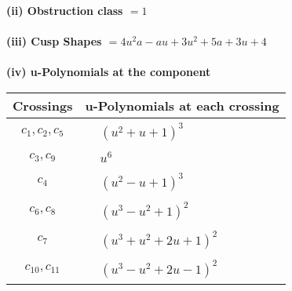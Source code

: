 \documentclass[1p]{elsarticle_modified}
\theoremstyle{definition}
\begin{document}
\flushleft \textbf{(ii) Obstruction class $= 1$}\\~\\
\flushleft \textbf{(iii) Cusp Shapes $= 4 u^2 a- a u+3 u^2+5 a+3 u+4$}\\~\\
\newpage\renewcommand{\arraystretch}{1}
\flushleft \textbf{(iv) u-Polynomials at the component}\newline \\
\begin{tabular}{m{50pt}|m{274pt}}
Crossings & \hspace{64pt}u-Polynomials at each crossing \\
\hline $$\begin{aligned}c_{1},c_{2},c_{5}\end{aligned}$$&$\begin{aligned}
&(u^2+u+1)^3
\end{aligned}$\\
\hline $$\begin{aligned}c_{3},c_{9}\end{aligned}$$&$\begin{aligned}
&u^6
\end{aligned}$\\
\hline $$\begin{aligned}c_{4}\end{aligned}$$&$\begin{aligned}
&(u^2- u+1)^3
\end{aligned}$\\
\hline $$\begin{aligned}c_{6},c_{8}\end{aligned}$$&$\begin{aligned}
&(u^3- u^2+1)^2
\end{aligned}$\\
\hline $$\begin{aligned}c_{7}\end{aligned}$$&$\begin{aligned}
&(u^3+u^2+2 u+1)^2
\end{aligned}$\\
\hline $$\begin{aligned}c_{10},c_{11}\end{aligned}$$&$\begin{aligned}
&(u^3- u^2+2 u-1)^2
\end{aligned}$\\
\hline
\end{tabular}\\~\\
\end{document}
